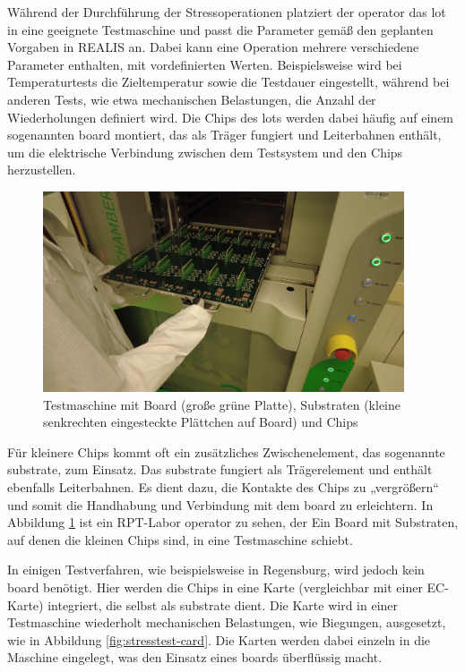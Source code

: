 Während der Durchführung der Stressoperationen platziert der \gls{operator} das \gls{lot} in eine geeignete Testmaschine und passt die Parameter gemäß den geplanten Vorgaben in \gls{REALIS} an. Dabei kann eine Operation mehrere verschiedene Parameter enthalten, mit vordefinierten Werten. Beispielsweise wird bei Temperaturtests die Zieltemperatur sowie die Testdauer eingestellt, während bei anderen Tests, wie etwa mechanischen Belastungen, die Anzahl der Wiederholungen definiert wird. Die Chips des \glspl{lot} werden dabei häufig auf einem sogenannten \gls{board} montiert, das als Träger fungiert und Leiterbahnen enthält, um die elektrische Verbindung zwischen dem Testsystem und den Chips herzustellen.

\begin{figure}[!htbp]
    \centering
    \includegraphics[width=0.95\textwidth]{bilder/testmaschine-with-board-substrate.png}
    \caption{Testmaschine mit Board (große grüne Platte), Substraten (kleine senkrechten eingesteckte Plättchen auf Board) und Chips \cite{RPTLaborIntern}}
    \label{fig:testmachine-with-board-substrate}
\end{figure}

Für kleinere Chips kommt oft ein zusätzliches Zwischenelement, das sogenannte \gls{substrate}, zum Einsatz. Das \gls{substrate} fungiert als Trägerelement und enthält ebenfalls Leiterbahnen. Es dient dazu, die Kontakte des Chips zu „vergrößern“ und somit die Handhabung und Verbindung mit dem \gls{board} zu erleichtern.
In Abbildung \ref{fig:testmachine-with-board-substrate} ist ein \gls{RPT}-Labor \gls{operator} zu sehen, der Ein Board mit Substraten, auf denen die kleinen Chips sind, in eine Testmaschine schiebt.


In einigen Testverfahren, wie beispielsweise in Regensburg, wird jedoch kein \gls{board} benötigt. Hier werden die Chips in eine Karte (vergleichbar mit einer EC-Karte) integriert, die selbst als \gls{substrate} dient. Die Karte wird in einer Testmaschine wiederholt mechanischen Belastungen, wie Biegungen, ausgesetzt, wie in Abbildung \ref{fig:stresstest-card}. Die Karten werden dabei einzeln in die Maschine eingelegt, was den Einsatz eines \glspl{board} überflüssig macht.

